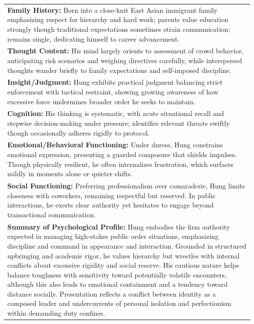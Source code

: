 \documentclass[11pt]{article}
\begin{document}
\begin{table}[ht]
\begin{tabularx}{\textwidth}{X}
\textbf{Family History:} Born into a close-knit East Asian immigrant family emphasizing respect for hierarchy and hard work; parents value education strongly though traditional expectations sometimes strain communication; remains single, dedicating himself to career advancement. \\[4pt]

\textbf{Thought Content:} His mind largely orients to assessment of crowd behavior, anticipating risk scenarios and weighing directives carefully, while interspersed thoughts wander briefly to family expectations and self-imposed discipline. \\[4pt]

\textbf{Insight/Judgment:} Hung exhibits practical judgment balancing strict enforcement with tactical restraint, showing growing awareness of how excessive force undermines broader order he seeks to maintain. \\[4pt]

\textbf{Cognition:} His thinking is systematic, with acute situational recall and stepwise decision-making under pressure; identifies relevant threats swiftly though occasionally adheres rigidly to protocol. \\[4pt]

\textbf{Emotional/Behavioral Functioning:} Under duress, Hung constrains emotional expression, presenting a guarded composure that shields impulses. Though physically resilient, he often internalizes frustration, which surfaces mildly in moments alone or quieter shifts. \\[4pt]

\textbf{Social Functioning:} Preferring professionalism over camaraderie, Hung limits closeness with coworkers, remaining respectful but reserved. In public interactions, he exerts clear authority yet hesitates to engage beyond transactional communication. \\[4pt]

\textbf{Summary of Psychological Profile:} Hung embodies the firm authority expected in managing high-stakes public order situations, emphasizing discipline and command in appearance and interaction. Grounded in structured upbringing and academic rigor, he values hierarchy but wrestles with internal conflicts about excessive rigidity and social reserve. His cautious nature helps balance toughness with sensitivity toward potentially volatile encounters, although this also leads to emotional containment and a tendency toward distance socially. Presentation reflects a conflict between identity as a composed leader and undercurrents of personal isolation and perfectionism within demanding duty confines. \\


\bottomrule
\end{tabularx}
\end{table}
\end{document}
